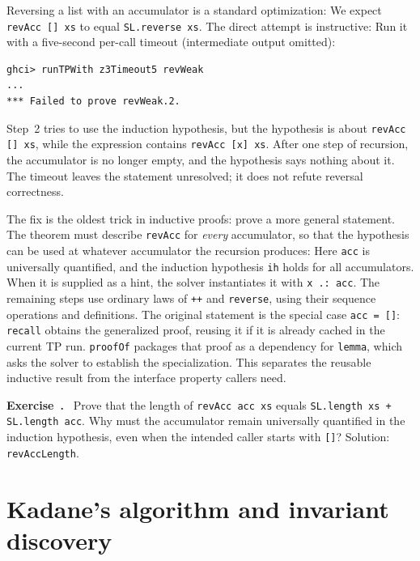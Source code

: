 \documentclass[review]{jfp-epi}
\newcommand{\code}[1]{\texttt{#1}}
\newcounter{exercise}
\newenvironment{exercise}{\refstepcounter{exercise}\par\medskip\noindent
  \textbf{Exercise~\theexercise.}\ }{\par\medskip}
\begin{document}
Reversing a list with an accumulator is a standard optimization:
We expect \code{revAcc [] xs} to equal \code{SL.reverse xs}. The direct attempt
is instructive:
Run it with a five-second per-call timeout (intermediate output omitted):
\begin{lstlisting}[style=output]
ghci> runTPWith z3Timeout5 revWeak
...
*** Failed to prove revWeak.2.
\end{lstlisting}
Step~2 tries to use the induction hypothesis, but the hypothesis is about
\code{revAcc [] xs}, while the expression contains \code{revAcc [x] xs}. After
one step of recursion, the accumulator is no longer empty, and the hypothesis says
nothing about it. The timeout leaves the statement unresolved; it does not
refute reversal correctness.

The fix is the oldest trick in inductive proofs: prove a more general statement.
The theorem must describe \code{revAcc} for \emph{every} accumulator, so that the
hypothesis can be used at whatever accumulator the recursion produces:
Here \code{acc} is universally quantified, and the induction hypothesis
\code{ih} holds for all accumulators. When it is supplied as a hint, the solver
instantiates it with \code{x .: acc}. The remaining steps use ordinary laws of
\code{++} and \code{reverse}, using their sequence operations and definitions.
The original statement is the special case \code{acc = []}:
\code{recall} obtains the generalized proof, reusing it if it is already cached
in the current TP run. \code{proofOf} packages that proof as a dependency for
\code{lemma}, which asks the solver to establish the specialization. This
separates the reusable inductive result from the interface property callers need.

\begin{exercise}
Prove that the length of \code{revAcc acc xs} equals
\code{SL.length xs + SL.length acc}.
Why must the accumulator remain universally quantified in the induction
hypothesis, even when the intended caller starts with \code{[]}?
Solution: \code{revAccLength}.
\end{exercise}

\section{Kadane's algorithm and invariant discovery}
\label{sec:kadane}
\end{document}
